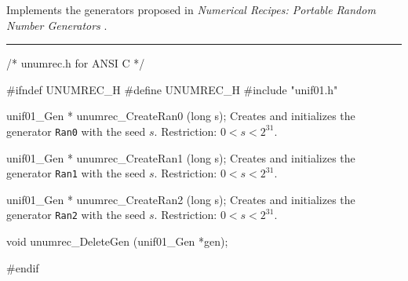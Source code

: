 
Implements the  generators proposed in
{\em Numerical Recipes: Portable Random Number Generators\/}
 \cite{rPRE92a,rPRE92b}.


\bigskip
\hrule
\code
\hide
/* unumrec.h for ANSI C */

#ifndef UNUMREC_H
#define UNUMREC_H
\endhide
#include "unif01.h"


unif01_Gen * unumrec_CreateRan0 (long s);
\endcode
  \tab Creates and initializes the generator {\tt Ran0} with the seed $s$. 
%
   Restriction: $0 < s < 2^{31}$.
 \endtab
\code


unif01_Gen * unumrec_CreateRan1 (long s);
\endcode
  \tab Creates and initializes the generator {\tt Ran1} with the seed $s$. 
%
 Restriction: $0 < s < 2^{31}$.
 \endtab
\code


unif01_Gen * unumrec_CreateRan2 (long s);
\endcode 
  \tab  Creates and initializes the generator {\tt Ran2} with the seed $s$. 
%
  Restriction: $0 < s < 2^{31}$.
 \endtab



\code

void unumrec_DeleteGen (unif01_Gen *gen);
\endcode
 \tab \DelGen
 \endtab
\code

\hide
#endif
\endhide
\endcode
